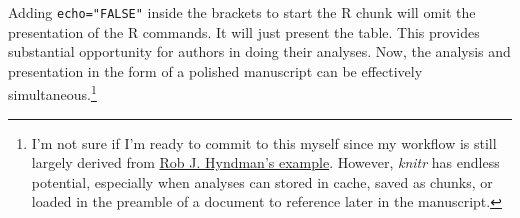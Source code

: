\documentclass[11pt,]{article}
\begin{document}
Adding \texttt{echo="FALSE"} inside the brackets to start the R chunk
will omit the presentation of the R commands. It will just present the
table. This provides substantial opportunity for authors in doing their
analyses. Now, the analysis and presentation in the form of a polished
manuscript can be effectively simultaneous.\footnote{I'm not sure if I'm
  ready to commit to this myself since my workflow is still largely
  derived from
  \href{http://robjhyndman.com/hyndsight/workflow-in-r/}{Rob J.
  Hyndman's example}. However, \emph{knitr} has endless potential,
  especially when analyses can stored in cache, saved as chunks, or
  loaded in the preamble of a document to reference later in the
  manuscript.}





\newpage
\singlespacing 

\end{document}
